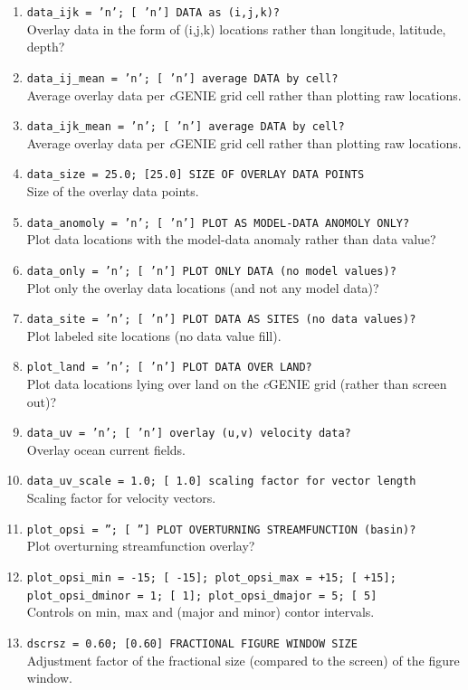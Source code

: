 \documentclass[11pt,fleqn]{book} %
\begin{document}
{\begin{enumerate}
\\ Overlay data in the form of (i,j) locations rather than longitude,latitude?
\item \texttt{data\_ijk = 'n';          [ 'n']  DATA as (i,j,k)?}
\\ Overlay data in the form of (i,j,k) locations rather than longitude, latitude, depth?
\item \texttt{data\_ij\_mean = 'n';     [ 'n']  average DATA by cell?}
\\ Average overlay data per \textit{c}GENIE grid cell rather than plotting raw locations.
\item \texttt{data\_ijk\_mean = 'n';     [ 'n']  average DATA by cell?}
\\ Average overlay data per \textit{c}GENIE grid cell rather than plotting raw locations.
\item \texttt{data\_size = 25.0;       [25.0]  SIZE OF OVERLAY DATA POINTS}
\\ Size of the overlay data points.
\item \texttt{data\_anomoly = 'n';     [ 'n']  PLOT AS MODEL-DATA ANOMOLY ONLY?}
\\ Plot data locations with the model-data anomaly rather than data value?
\item \texttt{data\_only = 'n';        [ 'n']  PLOT ONLY DATA (no model values)?}
\\ Plot only the overlay data locations (and not any model data)?
\item \texttt{data\_site = 'n';        [ 'n']  PLOT DATA AS SITES (no data values)?}
\\ Plot labeled site locations (no data value fill).
\item \texttt{plot\_land = 'n';        [ 'n']  PLOT DATA OVER LAND?}
\\ Plot data locations lying over land on the \textit{c}GENIE grid (rather than screen out)?
\item \texttt{data\_uv = 'n';          [ 'n']  overlay (u,v) velocity data?}
\\ Overlay ocean current fields.
\item \texttt{data\_uv\_scale = 1.0;    [ 1.0]  scaling factor for vector length}
\\ Scaling factor for velocity vectors.
\item \texttt{plot\_opsi = '';         [  '']  PLOT OVERTURNING STREAMFUNCTION (basin)?}
\\ Plot overturning streamfunction overlay?
\item \texttt{plot\_opsi\_min = -15;    [ -15]; plot\_opsi\_max = +15;    [ +15]; 
plot\_opsi\_dminor = 1;   [   1]; plot\_opsi\_dmajor = 5;   [   5] }
\\ Controls on min, max and (major and minor) contor intervals.
\item \texttt{dscrsz = 0.60;          [0.60]  FRACTIONAL FIGURE WINDOW SIZE}
\\ Adjustment factor of the fractional size (compared to the screen) of the figure window.
\end{enumerate}}
\end{document}
